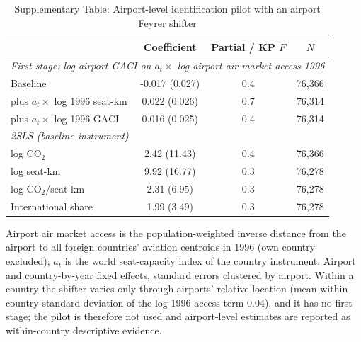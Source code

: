 \begin{table}[htbp]
\centering
\begin{threeparttable}
\caption{Supplementary Table: Airport-level identification pilot with an airport Feyrer shifter}
\label{tab:airport_iv}
\scriptsize
\begin{tabular}{lccc}
\toprule
 & Coefficient & Partial / KP $F$ & $N$ \\
\midrule
\multicolumn{4}{l}{\textit{First stage: log airport GACI on $a_t \times$ log airport air market access 1996}} \\
  Baseline & -0.017 (0.027) & 0.4 & 76,366 \\
  \quad plus $a_t \times$ log 1996 seat-km & 0.022 (0.026) & 0.7 & 76,314 \\
  \quad plus $a_t \times$ log 1996 GACI & 0.016 (0.025) & 0.4 & 76,314 \\
\midrule
\multicolumn{4}{l}{\textit{2SLS (baseline instrument)}} \\
  log CO$_2$ & 2.42 (11.43) & 0.4 & 76,366 \\
  log seat-km & 9.92 (16.77) & 0.3 & 76,278 \\
  log CO$_2$/seat-km & 2.31 (6.95) & 0.3 & 76,278 \\
  International share & 1.99 (3.49) & 0.3 & 76,278 \\
\bottomrule
\end{tabular}
\begin{tablenotes}\scriptsize
\item Airport air market access is the population-weighted inverse distance from the airport to all foreign countries' aviation centroids in 1996 (own country excluded); $a_t$ is the world seat-capacity index of the country instrument. Airport and country-by-year fixed effects, standard errors clustered by airport. Within a country the shifter varies only through airports' relative location (mean within-country standard deviation of the log 1996 access term 0.04), and it has no first stage; the pilot is therefore not used and airport-level estimates are reported as within-country descriptive evidence.
\end{tablenotes}
\end{threeparttable}
\end{table}
